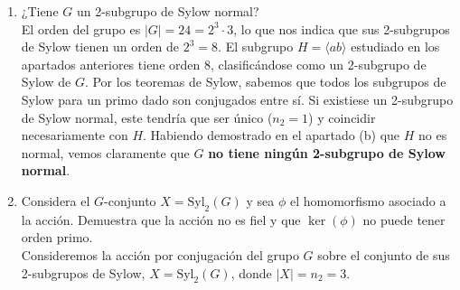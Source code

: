 \documentclass[12pt]{article}
\begin{document}
\begin{ejercicio}[0.5 puntos]
\begin{enumerate}[label=\alph*)]
            Primero, manipulamos la relación $bab = a$. Multiplicando por $b^{-1}$ por la derecha obtenemos:
            \[
            ba = ab^{-1} = ab^2
            \]
            Ahora conjugamos $ab$ por $b$:
            \[
            b (ab) b^{-1} = (bab)b^{-1} = a b^{-1} = a b^2
            \]
            Para que $H \triangleleft G$, el elemento $ab^2$ debería pertenecer a $H$. Vamos a demostrar que esto es imposible.
            Cualquier elemento de $H$ es de la forma $(ab)^k$. 
            \begin{itemize}
                \item Si $k$ es par, $(ab)^{2m} = a^{2m}$. Si $ab^2 = a^{2m}$, entonces $b^2 = a^{2m-1}$. Esto implicaría que $b^2 \in \langle a \rangle$, lo cual es imposible pues los órdenes de $a$ y $b$ son coprimos ($\text{mcd}(8,3)=1$) y la intersección de sus subgrupos generados es trivial.
                \item Si $k$ es impar, $(ab)^{2m+1} = a^{2m}ab = a^{2m+1}b$. Si $ab^2 = a^{2m+1}b$, cancelando por la izquierda y derecha obtendríamos $b = a^{2m} \in \langle a \rangle$, llegando a la misma contradicción.
            \end{itemize}
            Como $ab^2 \notin H$, tenemos que $b H b^{-1} \neq H$. 
            \\
            \textbf{Conclusión:} El subgrupo $H = \langle ab \rangle$ \textbf{no es normal} en $G$.

            \item  ¿Tiene $G$ un 2-subgrupo de Sylow normal?\\
            El orden del grupo es $|G| = 24 = 2^3 \cdot 3$, lo que nos indica que sus 2-subgrupos de Sylow tienen un orden de $2^3 = 8$. 
            El subgrupo $H = \langle ab \rangle$ estudiado en los apartados anteriores tiene orden 8, clasificándose como un 2-subgrupo de Sylow de $G$. 
            Por los teoremas de Sylow, sabemos que todos los subgrupos de Sylow para un primo dado son conjugados entre sí. 
            Si existiese un 2-subgrupo de Sylow normal, este tendría que ser único ($n_2=1$) y coincidir necesariamente con $H$. Habiendo demostrado en el apartado (b) que $H$ no es normal, vemos claramente que $G$ \textbf{no tiene ningún 2-subgrupo de Sylow normal}.
            
            \item  Considera el $G$-conjunto $X = \text{Syl}_2(G)$ y sea $\phi$ el homomorfismo asociado a la acción. Demuestra que la acción no es fiel y que $\ker(\phi)$ no puede tener orden primo.\\
            Consideremos la acción por conjugación del grupo $G$ sobre el conjunto de sus 2-subgrupos de Sylow, $X = \text{Syl}_2(G)$, donde $|X| = n_2 = 3$. 
            

\end{enumerate}
\end{ejercicio}
\end{document}
